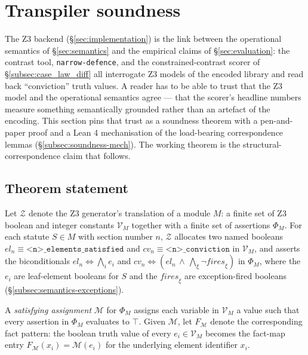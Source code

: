 \section{Transpiler soundness}
\label{sec:soundness}

The Z3 backend (\S\ref{sec:implementation}) is the link between
the operational semantics of \S\ref{sec:semantics} and the
empirical claims of \S\ref{sec:evaluation}: the contrast tool,
\texttt{narrow-defence}, and the constrained-contrast scorer of
\S\ref{subsec:case_law_diff} all interrogate Z3 models of the
encoded library and read back ``conviction'' truth values. A
reader has to be able to trust that the Z3 model and the
operational semantics agree --- that the scorer's headline
numbers measure something semantically grounded rather than an
artefact of the encoding. This section pins that trust as a
soundness theorem with a pen-and-paper proof and a Lean 4
mechanisation of the load-bearing correspondence lemmas
(\S\ref{subsec:soundness-mech}). The working theorem is the
structural-correspondence claim that follows.

\subsection{Theorem statement}
\label{subsec:soundness-statement}

Let $\mathcal{Z}$ denote the Z3 generator's translation of a
module $M$: a finite set of Z3 boolean and integer constants
$\mathcal{V}_M$ together with a finite set of assertions
$\Phi_M$. For each statute $S \in M$ with section number $n$,
$\mathcal{Z}$ allocates two named booleans
$\mathit{el}_n \equiv \texttt{<n>\_elements\_satisfied}$ and
$\mathit{cv}_n \equiv \texttt{<n>\_conviction}$ in
$\mathcal{V}_M$, and asserts the biconditionals
$\mathit{el}_n \Leftrightarrow \bigwedge_i e_i$ and
$\mathit{cv}_n \Leftrightarrow (\mathit{el}_n \,\wedge\,
\bigwedge_\xi \neg \mathit{fires}_\xi)$ in $\Phi_M$, where the
$e_i$ are leaf-element booleans for $S$ and the
$\mathit{fires}_\xi$ are exception-fired booleans
(\S\ref{subsec:semantics-exceptions}).

A \emph{satisfying assignment} $\mathcal{M}$ for $\Phi_M$ assigns
each variable in $\mathcal{V}_M$ a value such that every
assertion in $\Phi_M$ evaluates to $\top$. Given $\mathcal{M}$,
let $F_\mathcal{M}$ denote the corresponding fact pattern: the
boolean truth value of every $e_i \in \mathcal{V}_M$ becomes the
fact-map entry $F_\mathcal{M}(x_i) = \mathcal{M}(e_i)$ for the
underlying element identifier $x_i$.

